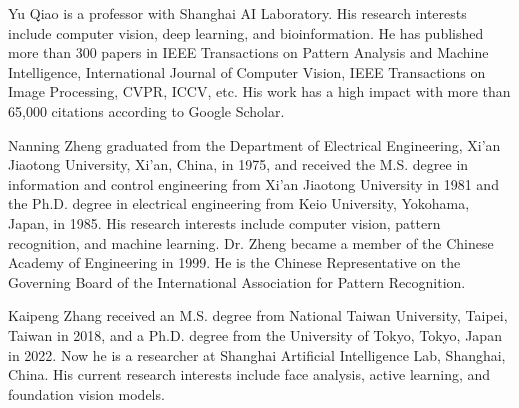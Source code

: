 \begin{IEEEbiography}
{Yu Qiao} is a professor with Shanghai AI Laboratory. His research interests include computer vision, deep learning, and bioinformation. He has published more than 300 papers in IEEE Transactions on Pattern Analysis and Machine Intelligence, International Journal of Computer Vision, IEEE Transactions on Image Processing, CVPR, ICCV, etc. His work has a high
impact with more than 65,000 citations according to Google Scholar.
\end{IEEEbiography}

\begin{IEEEbiography}{Nanning Zheng} graduated from the Department of Electrical Engineering, Xi’an Jiaotong University, Xi’an, China, in 1975, and received the M.S. degree in information and control engineering from Xi’an Jiaotong University in 1981 and the Ph.D. degree in electrical engineering
from Keio University, Yokohama, Japan, in 1985. His research interests include computer vision, pattern recognition, and machine learning.
Dr. Zheng became a member of the Chinese Academy of Engineering in 1999. He is the Chinese Representative on the Governing Board of the International Association for Pattern Recognition. 
\end{IEEEbiography}

\begin{IEEEbiography}{Kaipeng Zhang}
received an M.S. degree from National Taiwan University, Taipei, Taiwan in 2018, and a Ph.D. degree from the University of Tokyo, Tokyo, Japan in 2022.
Now he is a researcher at Shanghai Artificial Intelligence Lab, Shanghai, China. His current research interests include face analysis, active learning, and foundation vision models.
\end{IEEEbiography}

\newpage

\vfill

